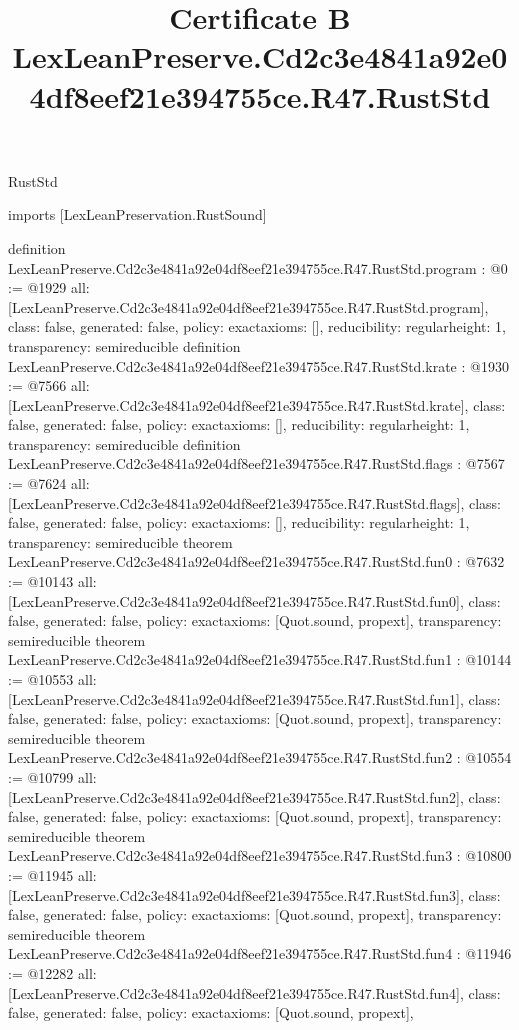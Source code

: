 \begin{lexlean}{RustStd}
\title{Certificate B LexLeanPreserve.Cd2c3e4841a92e04df8eef21e394755ce.R47.RustStd}
\begin{coremodule}
imports [LexLeanPreservation.RustSound]

definition LexLeanPreserve.Cd2c3e4841a92e04df8eef21e394755ce.R47.RustStd.program : @0 := @1929 {
  all: [LexLeanPreserve.Cd2c3e4841a92e04df8eef21e394755ce.R47.RustStd.program],
  class: false,
  generated: false,
  policy: exact{axioms: []},
  reducibility: regular{height: 1},
  transparency: semireducible
}
definition LexLeanPreserve.Cd2c3e4841a92e04df8eef21e394755ce.R47.RustStd.krate : @1930 := @7566 {
  all: [LexLeanPreserve.Cd2c3e4841a92e04df8eef21e394755ce.R47.RustStd.krate],
  class: false,
  generated: false,
  policy: exact{axioms: []},
  reducibility: regular{height: 1},
  transparency: semireducible
}
definition LexLeanPreserve.Cd2c3e4841a92e04df8eef21e394755ce.R47.RustStd.flags : @7567 := @7624 {
  all: [LexLeanPreserve.Cd2c3e4841a92e04df8eef21e394755ce.R47.RustStd.flags],
  class: false,
  generated: false,
  policy: exact{axioms: []},
  reducibility: regular{height: 1},
  transparency: semireducible
}
theorem LexLeanPreserve.Cd2c3e4841a92e04df8eef21e394755ce.R47.RustStd.fun0 : @7632 := @10143 {
  all: [LexLeanPreserve.Cd2c3e4841a92e04df8eef21e394755ce.R47.RustStd.fun0],
  class: false,
  generated: false,
  policy: exact{axioms: [Quot.sound, propext]},
  transparency: semireducible
}
theorem LexLeanPreserve.Cd2c3e4841a92e04df8eef21e394755ce.R47.RustStd.fun1 : @10144 := @10553 {
  all: [LexLeanPreserve.Cd2c3e4841a92e04df8eef21e394755ce.R47.RustStd.fun1],
  class: false,
  generated: false,
  policy: exact{axioms: [Quot.sound, propext]},
  transparency: semireducible
}
theorem LexLeanPreserve.Cd2c3e4841a92e04df8eef21e394755ce.R47.RustStd.fun2 : @10554 := @10799 {
  all: [LexLeanPreserve.Cd2c3e4841a92e04df8eef21e394755ce.R47.RustStd.fun2],
  class: false,
  generated: false,
  policy: exact{axioms: [Quot.sound, propext]},
  transparency: semireducible
}
theorem LexLeanPreserve.Cd2c3e4841a92e04df8eef21e394755ce.R47.RustStd.fun3 : @10800 := @11945 {
  all: [LexLeanPreserve.Cd2c3e4841a92e04df8eef21e394755ce.R47.RustStd.fun3],
  class: false,
  generated: false,
  policy: exact{axioms: [Quot.sound, propext]},
  transparency: semireducible
}
theorem LexLeanPreserve.Cd2c3e4841a92e04df8eef21e394755ce.R47.RustStd.fun4 : @11946 := @12282 {
  all: [LexLeanPreserve.Cd2c3e4841a92e04df8eef21e394755ce.R47.RustStd.fun4],
  class: false,
  generated: false,
  policy: exact{axioms: [Quot.sound, propext]},
}
\end{coremodule}
\end{lexlean}
